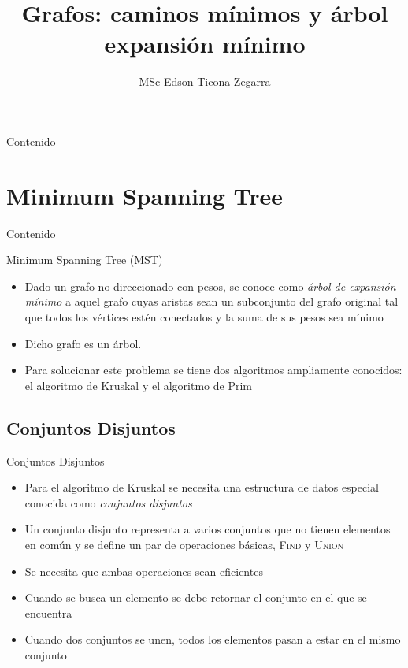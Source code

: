 \documentclass[handout]{beamer}
\title{Grafos: caminos m\'inimos y \'arbol expansi\'on m\'inimo}
\author{MSc Edson Ticona Zegarra}
\institute{Campamento de Programaci\'on}
\date{}
\begin{document}
\maketitle

\begin{frame}{Contenido}
\tableofcontents
\end{frame}

\section{Minimum Spanning Tree}
\begin{frame}{Contenido}
\tableofcontents[currentsection]
\end{frame}

\begin{frame}{Minimum Spanning Tree (MST)}
 \begin{itemize}
   \item Dado un grafo no direccionado con pesos, se conoce como \textit{\'arbol de expansi\'on m\'inimo} a aquel grafo cuyas aristas sean un subconjunto del grafo original tal que todos los v\'ertices est\'en conectados y la suma de sus pesos sea m\'inimo
      \pause
    \item Dicho grafo es un \'arbol.
      \pause
    \item Para solucionar este problema se tiene dos algoritmos ampliamente conocidos: el algoritmo de Kruskal y el algoritmo de Prim
  \end{itemize}
\end{frame}

\subsection{Conjuntos Disjuntos}
\begin{frame}{Conjuntos Disjuntos}
  \begin{itemize}
    \item Para el algoritmo de Kruskal se necesita una estructura de datos especial conocida como \textit{conjuntos disjuntos}
      \pause
    \item Un conjunto disjunto representa a varios conjuntos que no tienen elementos en com\'un y se define un par de operaciones b\'asicas, \textsc{Find} y \textsc{Union}
      \pause
    \item Se necesita que ambas operaciones sean eficientes
      \pause
    \item Cuando se busca un elemento se debe retornar el conjunto en el que se encuentra
      \pause
    \item Cuando dos conjuntos se unen, todos los elementos pasan a estar en el mismo conjunto
  \end{itemize}
\end{frame}
\end{document}
